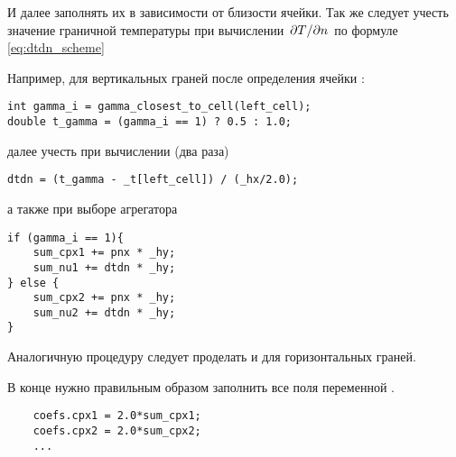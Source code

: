 И далее заполнять их в зависимости от близости ячейки.
Так же следует учесть значение граничной температуры
при вычислении $\left.\partial T\middle/\partial n\right.$ по формуле \cref{eq:dtdn_scheme}

Например, для вертикальных граней
после определения ячейки :
\begin{verbatim}
int gamma_i = gamma_closest_to_cell(left_cell);
double t_gamma = (gamma_i == 1) ? 0.5 : 1.0;
\end{verbatim}
далее учесть при вычислении  (два раза)
\begin{verbatim}
dtdn = (t_gamma - _t[left_cell]) / (_hx/2.0);
\end{verbatim}
а также при выборе агрегатора
\begin{verbatim}
if (gamma_i == 1){
	sum_cpx1 += pnx * _hy;
	sum_nu1 += dtdn * _hy;
} else {
	sum_cpx2 += pnx * _hy;
	sum_nu2 += dtdn * _hy;
}
\end{verbatim}

Аналогичную процедуру следует проделать и для горизонтальных граней.

В конце нужно правильным образом заполнить все поля
переменной .
\begin{verbatim}
	coefs.cpx1 = 2.0*sum_cpx1;
	coefs.cpx2 = 2.0*sum_cpx2;
	...
\end{verbatim}
